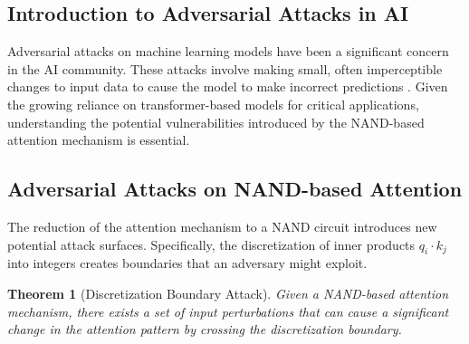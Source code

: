 \documentclass[11pt]{article}
\newtheorem{theorem}{Theorem}[section]
\theoremstyle{definition}
\begin{document}
\subsection{Introduction to Adversarial Attacks in AI}






Adversarial attacks on machine learning models have been a significant concern in the AI community. These attacks involve making small, often imperceptible changes to input data to cause the model to make incorrect predictions \cite{szegedy2013intriguing}. Given the growing reliance on transformer-based models for critical applications, understanding the potential vulnerabilities introduced by the NAND-based attention mechanism is essential.













\subsection{Adversarial Attacks on NAND-based Attention}






The reduction of the attention mechanism to a NAND circuit introduces new potential attack surfaces. Specifically, the discretization of inner products \( q_i \cdot k_j \) into integers creates boundaries that an adversary might exploit. 













\begin{theorem}[Discretization Boundary Attack]






Given a NAND-based attention mechanism, there exists a set of input perturbations that can cause a significant change in the attention pattern by crossing the discretization boundary.






\end{theorem}
\end{document}
